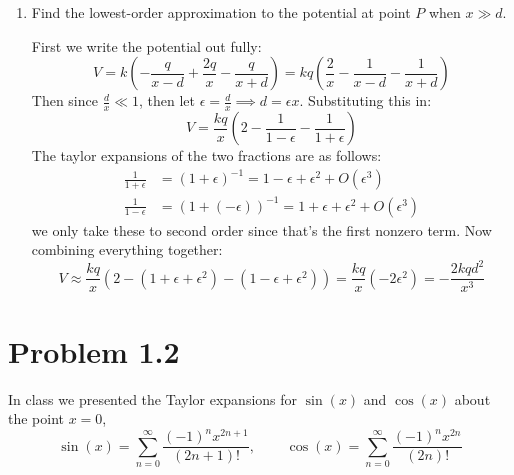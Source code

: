 \documentclass[10pt]{article}
\begin{document}
	\begin{enumerate}[label=\alph*), resume]
		\item Find the lowest-order approximation to the potential at point $P$ when $x \gg d$. 

			\begin{solution}
				First we write the potential out fully:
				\[
				V = k\left( -\frac{q}{x - d} + \frac{2q}{x} - \frac{q}{x + d} \right) = kq\left( 
				\frac{2}{x} - \frac{1}{x - d} - \frac{1}{x+d}\right) 
				\] 
				Then since $\frac{d}{x} \ll 1$, then let $\epsilon = \frac{d}{x} \implies d = \epsilon x$. 
				Substituting this in: 
				\[
				V = \frac{kq}{x}\left( 2 - \frac{1}{1 - \epsilon} - \frac{1}{1 + \epsilon } \right) 
				\] 
				The taylor expansions of the two fractions are as follows:
				\begin{align*}
					\frac{1}{1 + \epsilon} &= (1 + \epsilon)^{-1} = 1 - \epsilon + \epsilon^2 + O(\epsilon^3)\\
					\frac{1}{1 - \epsilon} &= (1 + (-\epsilon))^{-1} = 1 + \epsilon + \epsilon^2 + O(\epsilon^3)
				\end{align*}
				we only take these to second order since that's the first nonzero term. Now combining 
				everything together:
				\[
				V \approx \frac{kq}{x}(2 - (1 + \epsilon + \epsilon^2) - (1 - \epsilon + \epsilon^2)) =
				\frac{kq}{x}(-2\epsilon^2) = -\frac{2kqd^2}{x^3}
				\] 

			\end{solution}
	\end{enumerate}
	
	\pagebreak
	\section*{Problem 1.2}

	In class we presented the Taylor expansions for $\sin(x)$ and $\cos(x)$ about the point $x = 0$,
	\[
		\sin(x) = \sum_{n = 0}^\infty \frac{(-1)^n x^{2n + 1}}{(2n + 1)!}, \phantom{aaaa} \cos(x) = 
		\sum_{n = 0}^\infty \frac{(-1)^n x^{2n}}{(2n)!}
	\] 
\end{document}
